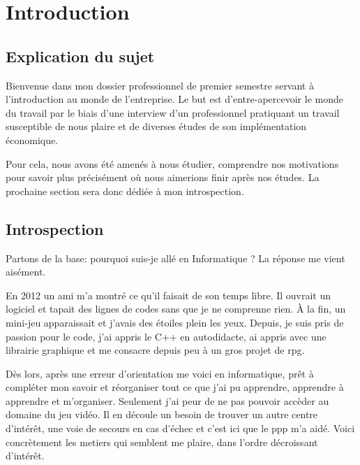 \documentclass[12pt, a4paper]{report} %
\begin{document}
\maketitle


\chapter{Introduction}

\section*{Explication du sujet}
Bienvenue dans mon dossier professionnel de premier semestre servant à l'introduction au monde de l'entreprise. Le but est d'entre-apercevoir le monde du travail par le biais d'une interview d'un professionnel pratiquant un travail susceptible de nous plaire et de diverses études de son implémentation économique.

Pour cela, nous avons été amenés à nous étudier, comprendre nos motivations pour savoir plus précisément où nous aimerions finir après nos études. La prochaine section sera donc dédiée à mon introspection.

\section{Introspection}
Partons de la base: pourquoi suis-je allé en Informatique ? La réponse me vient aisément.

En 2012 un ami m'a montré ce qu'il faisait de son temps libre. Il ouvrait un logiciel et tapait des lignes de codes sans que je ne comprenne rien. \`A la fin, un mini-jeu apparaissait et j'avais des étoiles plein les yeux. Depuis, je suis pris de passion pour le code, j'ai appris le C++ en autodidacte, ai appris avec une librairie graphique et me consacre depuis peu à un gros projet de \acrshort{rpg}.

Dès lors, après une erreur d'orientation me voici en informatique, prêt à compléter mon savoir et réorganiser tout ce que j'ai pu apprendre, apprendre à apprendre et m'organiser. Seulement j'ai peur de ne pas pouvoir accèder au domaine du jeu vidéo. Il en découle un besoin de trouver un autre centre d'intérêt, une voie de secours en cas d'échec et c'est ici que le \acrshort{ppp} m'a aidé. Voici concrètement les metiers qui semblent me plaire, dans l'ordre décroissant d'intérêt.
\end{document}
